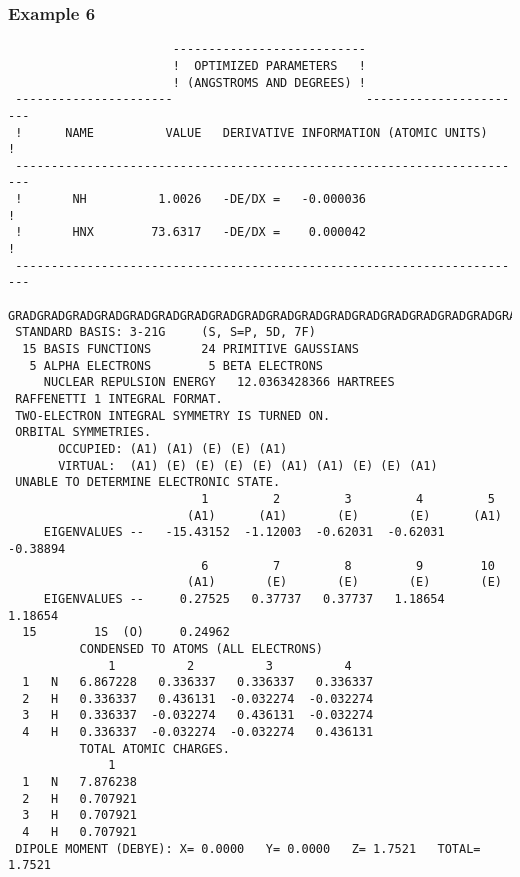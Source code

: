 \subsubsection{\sf Example 6}
{\small
\begin{verbatim}
                       ---------------------------
                       !  OPTIMIZED PARAMETERS   !
                       ! (ANGSTROMS AND DEGREES) !
 ----------------------                           -----------------------
 !      NAME          VALUE   DERIVATIVE INFORMATION (ATOMIC UNITS)     !
 ------------------------------------------------------------------------
 !       NH          1.0026   -DE/DX =   -0.000036                      !
 !       HNX        73.6317   -DE/DX =    0.000042                      !
 ------------------------------------------------------------------------
 GRADGRADGRADGRADGRADGRADGRADGRADGRADGRADGRADGRADGRADGRADGRADGRADGRADGRAD
 STANDARD BASIS: 3-21G     (S, S=P, 5D, 7F)
  15 BASIS FUNCTIONS       24 PRIMITIVE GAUSSIANS
   5 ALPHA ELECTRONS        5 BETA ELECTRONS
     NUCLEAR REPULSION ENERGY   12.0363428366 HARTREES
 RAFFENETTI 1 INTEGRAL FORMAT.
 TWO-ELECTRON INTEGRAL SYMMETRY IS TURNED ON.
 ORBITAL SYMMETRIES.
       OCCUPIED: (A1) (A1) (E) (E) (A1)
       VIRTUAL:  (A1) (E) (E) (E) (E) (A1) (A1) (E) (E) (A1)
 UNABLE TO DETERMINE ELECTRONIC STATE.
                           1         2         3         4         5
                         (A1)      (A1)       (E)       (E)      (A1)
     EIGENVALUES --   -15.43152  -1.12003  -0.62031  -0.62031  -0.38894
                           6         7         8         9        10
                         (A1)       (E)       (E)       (E)       (E)
     EIGENVALUES --     0.27525   0.37737   0.37737   1.18654   1.18654
  15        1S  (O)     0.24962
          CONDENSED TO ATOMS (ALL ELECTRONS)
              1          2          3          4
  1   N   6.867228   0.336337   0.336337   0.336337
  2   H   0.336337   0.436131  -0.032274  -0.032274
  3   H   0.336337  -0.032274   0.436131  -0.032274
  4   H   0.336337  -0.032274  -0.032274   0.436131
          TOTAL ATOMIC CHARGES.
              1
  1   N   7.876238
  2   H   0.707921
  3   H   0.707921
  4   H   0.707921
 DIPOLE MOMENT (DEBYE): X= 0.0000   Y= 0.0000   Z= 1.7521   TOTAL= 1.7521
\end{verbatim}
}
\newpage
